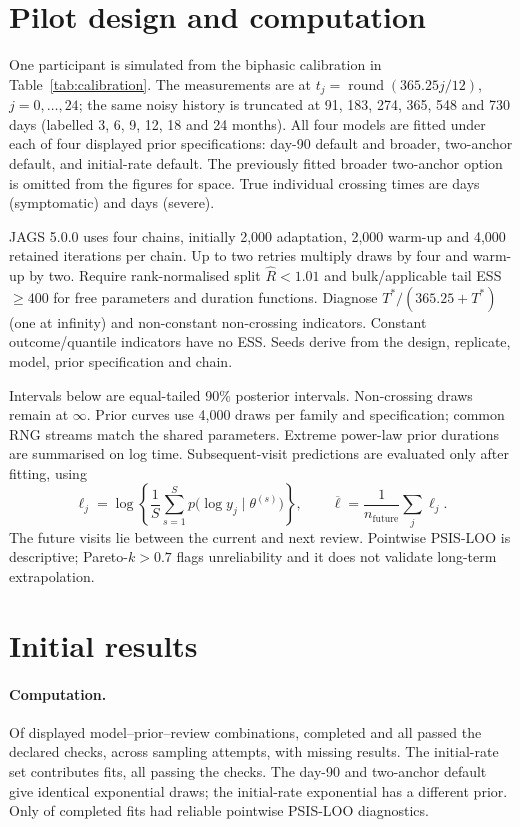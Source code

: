 \documentclass[11pt,a4paper]{article}
\begin{document}
\section{Pilot design and computation}
One participant is simulated from the biphasic calibration in
Table~\ref{tab:calibration}. The \ObservationCount{} measurements are at
$t_j=\operatorname{round}(365.25j/12)$, $j=0,\ldots,24$; the same noisy
history is truncated at 91, 183, 274, 365, 548 and 730 days (labelled
3, 6, 9, 12, 18 and 24 months). All four models are fitted under each
of four displayed prior specifications: day-90 default and broader,
two-anchor default, and initial-rate default. The previously fitted
broader two-anchor option is omitted from the figures for space.
True individual crossing times are
\TruthSym{} days (symptomatic) and \TruthSev{} days (severe).

JAGS 5.0.0 uses four chains, initially 2,000 adaptation, 2,000 warm-up
and 4,000 retained iterations per chain. Up to two retries multiply draws
by four and warm-up by two. Require rank-normalised split
$\widehat R<1.01$ and bulk/applicable tail ESS $\geq400$ for free
parameters and duration functions. Diagnose $T^*/(365.25+T^*)$ (one at
infinity) and non-constant non-crossing indicators. Constant
outcome/quantile indicators have no ESS. Seeds derive from the design,
replicate, model, prior specification and chain.

Intervals below are equal-tailed 90\% posterior intervals. Non-crossing
draws remain at $\infty$. Prior curves use 4,000 draws per family and
specification; common RNG streams match the shared parameters. Extreme
power-law prior durations are summarised on log time. Subsequent-visit
predictions are evaluated only after fitting, using
\begin{equation}
  \ell_j=\log\left\{\frac1S\sum_{s=1}^S
    p\bigl(\log y_j\mid\theta^{(s)}\bigr)\right\},\qquad
  \overline\ell=\frac1{n_{\mathrm{future}}}\sum_j\ell_j.
\end{equation}
The future visits lie between the current and next review. Pointwise
PSIS-LOO is descriptive; Pareto-$k>0.7$ flags unreliability and it does
not validate long-term extrapolation.

\section{Initial results}
\paragraph{Computation.} Of \PlannedCount{} displayed
model--prior--review combinations,
\FitCount{} completed and all \ConvergedCount{} passed the declared checks,
across \AttemptsCount{} sampling attempts, with \FailureCount{} missing
results. The initial-rate set contributes \RateFitCount{} fits, all
\RateConvergedCount{} passing the checks. The day-90 and two-anchor
default give identical exponential draws; the initial-rate exponential
has a different prior. Only \ReliableLooCount{} of \FitCount{}
completed fits had reliable pointwise PSIS-LOO diagnostics.
\end{document}
